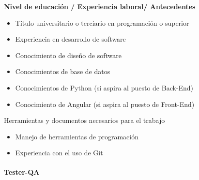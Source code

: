 \begin{itemize}
\begin{itemize}
                \end{itemize}
			{\correccionTexto                
            \item \textbf{Nivel de educación / Experiencia laboral/ Antecedentes}
                \begin{itemize}
                    \item Título universitario o terciario en programación o superior
                    \item Experiencia en desarrollo de software
                    \item Conocimiento de diseño de software
                    \item Conocimientos de base de datos
                    \item Conocimientos de Python (si aspira al puesto de Back-End)
                    \item Conocimiento de Angular (si aspira al puesto de Front-End)
                \end{itemize}
            \item Herramientas y documentos necesarios para el trabajo
            	\begin{itemize}
                    \item Manejo de herramientas de programación
                    \item Experiencia con el uso de Git
                \end{itemize}
			}                
		\end{itemize}
  
    	\paragraph{Tester-QA}  
    	          	  
